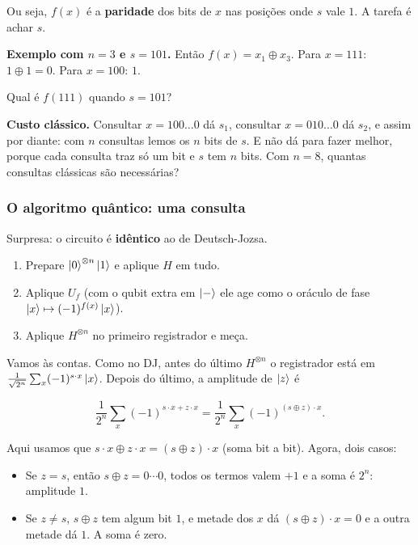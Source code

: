 Ou seja, \(f(x)\) é a \textbf{paridade} dos bits de \(x\) nas posições onde \(s\) vale \(1\). A tarefa é achar \(s\).

\textbf{Exemplo com \(n=3\) e \(s=101\).} Então \(f(x)=x_1\oplus x_3\). Para \(x=111\): \(1\oplus1=0\). Para \(x=100\): \(1\).

Qual é \(f(111)\) quando \(s=101\)?

\textbf{Custo clássico.} Consultar \(x=100\ldots0\) dá \(s_1\), consultar \(x=010\ldots0\) dá \(s_2\), e assim por diante: com \(n\) consultas lemos os \(n\) bits de \(s\). E não dá para fazer melhor, porque cada consulta traz só um bit e \(s\) tem \(n\) bits. Com \(n=8\), quantas consultas clássicas são necessárias?

\subsubsection{O algoritmo quântico: uma consulta}\label{o-algoritmo-quuxe2ntico-uma-consulta}

Surpresa: o circuito é \textbf{idêntico} ao de Deutsch-Jozsa.

\begin{enumerate}
\def\labelenumi{\arabic{enumi}.}
\tightlist
\item
  Prepare \(\left|{0}\right>^{\otimes n}\left|{1}\right>\) e aplique \(H\) em tudo.
\item
  Aplique \(U_f\) (com o qubit extra em \(\left|{-}\right>\) ele age como o oráculo de fase \(\left|{x}\right>\mapsto(-1)^{f(x)}\left|{x}\right>\)).
\item
  Aplique \(H^{\otimes n}\) no primeiro registrador e meça.
\end{enumerate}

Vamos às contas. Como no DJ, antes do último \(H^{\otimes n}\) o registrador está em \(\tfrac{1}{\sqrt{2^n}}\sum_x(-1)^{s\cdot x}\left|{x}\right>\). Depois do último, a amplitude de \(\left|{z}\right>\) é

\[
\frac{1}{2^n}\sum_x(-1)^{s\cdot x+z\cdot x}=\frac{1}{2^n}\sum_x(-1)^{(s\oplus z)\cdot x}.
\]

Aqui usamos que \(s\cdot x\oplus z\cdot x=(s\oplus z)\cdot x\) (soma bit a bit). Agora, dois casos:

\begin{itemize}
\tightlist
\item
  Se \(z=s\), então \(s\oplus z=0\cdots0\), todos os termos valem \(+1\) e a soma é \(2^n\): amplitude \(1\).
\item
  Se \(z\ne s\), \(s\oplus z\) tem algum bit \(1\), e metade dos \(x\) dá \((s\oplus z)\cdot x=0\) e a outra metade dá \(1\). A soma é zero.
\end{itemize}

